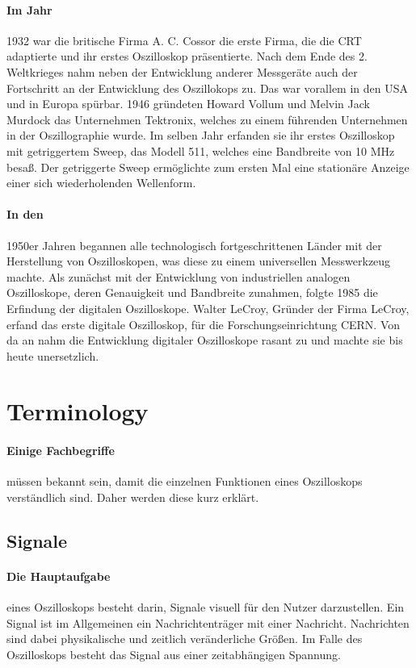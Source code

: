 \documentclass{article}
\begin{document}
\paragraph{Im Jahr}
1932 war die britische Firma A. C. Cossor die erste Firma, die die CRT adaptierte und ihr erstes Oszilloskop präsentierte. Nach dem Ende des 2. Weltkrieges nahm neben der Entwicklung anderer Messgeräte auch der Fortschritt an der Entwicklung des Oszillokops zu. Das war vorallem in den USA und in Europa spürbar. 1946 gründeten Howard Vollum und Melvin Jack Murdock das Unternehmen Tektronix, welches zu einem führenden Unternehmen in der Oszillographie wurde. Im selben Jahr erfanden sie ihr erstes Oszilloskop mit getriggertem Sweep, das Modell 511, welches eine Bandbreite von 10 MHz besaß. Der getriggerte Sweep ermöglichte zum ersten Mal eine stationäre Anzeige einer sich wiederholenden Wellenform.\cite{history}

\paragraph{In den}
1950er Jahren begannen alle technologisch fortgeschrittenen Länder mit der Herstellung von Oszilloskopen, was diese zu einem universellen Messwerkzeug machte. Als zunächst mit der Entwicklung von industriellen analogen Oszilloskope, deren Genauigkeit und Bandbreite zunahmen, folgte 1985 die Erfindung der digitalen Oszilloskope. Walter LeCroy, Gründer der Firma LeCroy, erfand das erste digitale Oszilloskop, für die Forschungseinrichtung CERN. Von da an nahm die Entwicklung digitaler Oszilloskope rasant zu und machte sie bis heute unersetzlich.\cite{history}

\section{Terminology}
\paragraph{Einige Fachbegriffe}
müssen bekannt sein, damit die einzelnen Funktionen eines Oszilloskops verständlich sind. Daher werden diese kurz erklärt.

\subsection{Signale}
\paragraph{Die Hauptaufgabe}
eines Oszilloskops besteht darin, Signale visuell für den Nutzer darzustellen. Ein Signal ist im Allgemeinen ein Nachrichtenträger mit einer Nachricht. Nachrichten sind dabei physikalische und zeitlich veränderliche Größen. Im Falle des Oszilloskops besteht das Signal aus einer zeitabhängigen Spannung.
\end{document}
